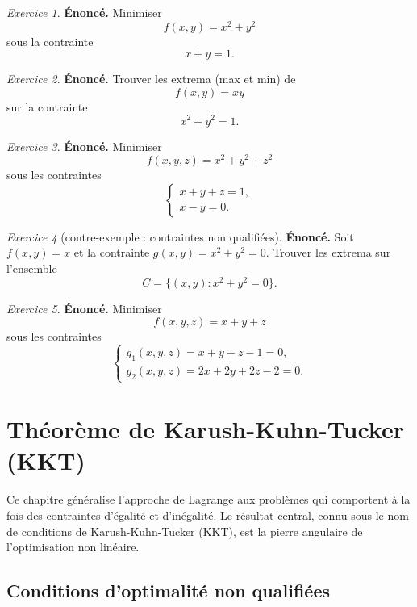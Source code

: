 \documentclass[a4paper,12pt,openany]{book}
\theoremstyle{plain}
\theoremstyle{definition}
\theoremstyle{remark}
\newtheorem{exercise}{Exercice}[section]
\theoremstyle{nbstyle}
\begin{document}
	
	\begin{exercise}
		\textbf{Énoncé.} Minimiser 
		\[
		f(x,y) = x^2 + y^2
		\]
		sous la contrainte 
		\[
		x + y = 1.
		\]
	\end{exercise}
	
	\begin{exercise}
		\textbf{Énoncé.} Trouver les extrema (max et min) de 
		\[
		f(x,y) = xy
		\]
		sur la contrainte 
		\[
		x^2 + y^2 = 1.
		\]
	\end{exercise}
	
	\begin{exercise}
		\textbf{Énoncé.} Minimiser 
		\[
		f(x,y,z) = x^2 + y^2 + z^2
		\]
		sous les contraintes
		\[
		\begin{cases}
		x + y + z = 1, \\
		x - y = 0.
		\end{cases}
		\]
	\end{exercise}
	
	\begin{exercise}[contre-exemple : contraintes non qualifiées]
		\textbf{Énoncé.} Soit $f(x,y) = x$ et la contrainte $g(x,y) = x^2 + y^2 = 0$. Trouver les extrema sur l’ensemble 
		\[
		C = \{ (x,y) : x^2 + y^2 = 0 \}.
		\]
	\end{exercise}
	
	\begin{exercise}
		\textbf{Énoncé.} Minimiser 
		\[
		f(x,y,z) = x + y + z
		\]
		sous les contraintes
		\[
		\begin{cases}
		g_1(x,y,z) = x + y + z - 1 = 0, \\
		g_2(x,y,z) = 2x + 2y + 2z - 2 = 0.
		\end{cases}
		\]
	\end{exercise}
	
	\chapter{Théorème de Karush-Kuhn-Tucker (KKT)}
	\label{chap:kkt}
	
	Ce chapitre généralise l'approche de Lagrange aux problèmes qui comportent à la fois des contraintes d'égalité et d'inégalité. Le résultat central, connu sous le nom de conditions de Karush-Kuhn-Tucker (KKT), est la pierre angulaire de l'optimisation non linéaire.
	
	\section{Conditions d’optimalité non qualifiées}
	
\end{document}
